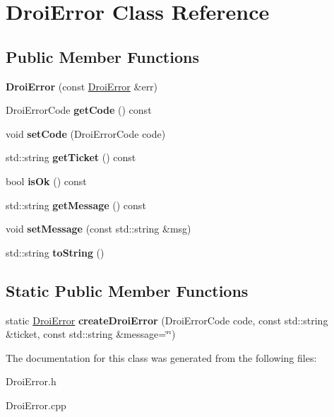 \hypertarget{class_droi_error}{}\section{Droi\+Error Class Reference}
\label{class_droi_error}
\subsection*{Public Member Functions}
\begin{DoxyCompactItemize}
\item 
\mbox{\label{class_droi_error_abe1ec9101820af7222bd7954b7e75596}} 
{\bfseries Droi\+Error} (const \hyperlink{class_droi_error}{Droi\+Error} \&err)
\item 
\mbox{\label{class_droi_error_a5bd9374d42ea8f98af5bcb3fb7606947}} 
Droi\+Error\+Code {\bfseries get\+Code} () const
\item 
\mbox{\label{class_droi_error_a36042125130a3d1f5858fd24621aecac}} 
void {\bfseries set\+Code} (Droi\+Error\+Code code)
\item 
\mbox{\label{class_droi_error_a08014365fc7c89e39c8b2d2ff75d177b}} 
std\+::string {\bfseries get\+Ticket} () const
\item 
\mbox{\label{class_droi_error_ad8cd9e6f51572503e13b0531b55550a9}} 
bool {\bfseries is\+Ok} () const
\item 
\mbox{\label{class_droi_error_a3b3b5d68e77dac01686ab3169b9f1d4e}} 
std\+::string {\bfseries get\+Message} () const
\item 
\mbox{\label{class_droi_error_a2ca2ae7ae152f21a69f662e6d86c6c70}} 
void {\bfseries set\+Message} (const std\+::string \&msg)
\item 
\mbox{\label{class_droi_error_ab76f17303ddee62c6f235a882d951e54}} 
std\+::string {\bfseries to\+String} ()
\end{DoxyCompactItemize}
\subsection*{Static Public Member Functions}
\begin{DoxyCompactItemize}
\item 
\mbox{\label{class_droi_error_a64305215aeb291b632d35f7a565f10d5}} 
static \hyperlink{class_droi_error}{Droi\+Error} {\bfseries create\+Droi\+Error} (Droi\+Error\+Code code, const std\+::string \&ticket, const std\+::string \&message=\char`\"{}\char`\"{})
\end{DoxyCompactItemize}


The documentation for this class was generated from the following files\+:\begin{DoxyCompactItemize}
\item 
Droi\+Error.\+h\item 
Droi\+Error.\+cpp\end{DoxyCompactItemize}
